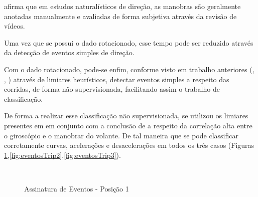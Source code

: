 \citeauthor{zheng2016unsupervised} afirma que em estudos naturalísticos de direção, as manobras são geralmente anotadas manualmente e avaliadas de forma subjetiva através da revisão de vídeos. 

Uma vez que se possui o dado rotacionado, esse tempo pode ser reduzido através da detecção de eventos simples de direção.

Com o dado rotacionado, pode-se enfim, conforme visto em trabalho anteriores (\citep{zheng2016unsupervised}, \citep{Paefgen:2012:DBA:2406367.2406412} , \cite{fazeen2012safe}) através de limiares heurísticos, detectar eventos simples a respeito das corridas, de forma não supervisionada, facilitando assim o trabalho de classificação. 

De forma a realizar esse classificação não supervisionada, se utilizou os limiares presentes em \citep{Paefgen:2012:DBA:2406367.2406412} em conjunto com a conclusão de \cite{zheng2015mobileutdrive} a respeito da correlação alta entre o giroscópio e o manobrar do volante. De tal maneira que se pode classificar corretamente curvas, acelerações e desacelerações em todos os três casos (Figuras \ref{fig:eventosTrip1},\ref{fig:eventosTrip2},\ref{fig:eventosTrip3}).

\begin{figure}
    \centering
    \\
    \caption{Assinatura de Eventos - Posição 1}
    \label{fig:eventosTrip1}
\end{figure}{}


